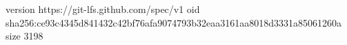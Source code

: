 version https://git-lfs.github.com/spec/v1
oid sha256:ce93c4345d841432c42bf76afa9074793b32eaa3161aa8018d3331a85061260a
size 3198
